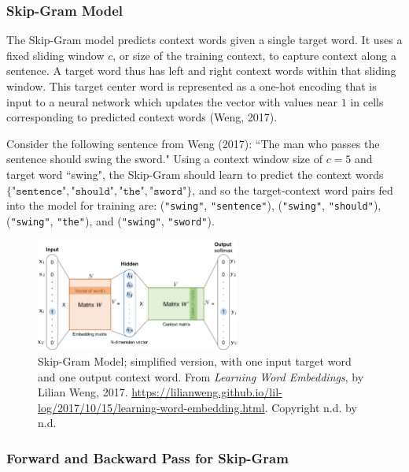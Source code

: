 \subsubsection{Skip-Gram Model} \label{sec:SkipGram}

The Skip-Gram model predicts context words given a single target word. It uses a fixed sliding window $c$, or size of the training context, to capture context along a sentence. A target word thus has left and right context words within that sliding window. This target center word is represented as a one-hot encoding that is input to a neural network which updates the vector with values near $1$ in cells corresponding to predicted context words (Weng, 2017). \newline

Consider the following sentence from Weng (2017): ``The man who passes the sentence should swing the sword." Using a context window size of $c = 5$ and target word ``swing", the Skip-Gram should learn to predict the context words $\{\texttt{"sentence"}, \texttt{"should"}, \texttt{"the"}, \texttt{"sword"} \}$, and so the target-context word pairs fed into the model for training are: (\texttt{"swing"}, \texttt{"sentence"}), (\texttt{"swing"}, \texttt{"should"}), (\texttt{"swing"}, \texttt{"the"}), and (\texttt{"swing"}, \texttt{"sword"}). \newline

\begin{figure}[h]
\vspace{-5pt}
\centering
\includegraphics[width=0.6\textwidth]{imgs/skipgram_image.png}
\vspace{-5pt}
\caption{\footnotesize Skip-Gram Model; simplified version, with one input target word and one output context word. From \emph{Learning Word Embeddings}, by Lilian Weng, 2017. \url{https://lilianweng.github.io/lil-log/2017/10/15/learning-word-embedding.html}. Copyright n.d. by n.d.}
\label{fig:SkipGram}
\vspace{-5pt}
\end{figure}

\subsubsection{Forward and Backward Pass for Skip-Gram}

